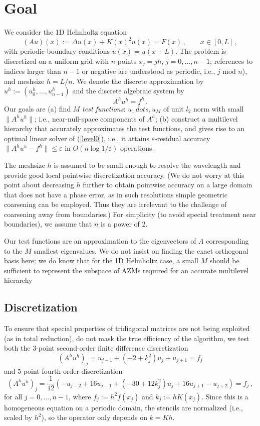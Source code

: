 \documentclass{article}
\begin{document}
\section{Goal}
We consider the 1D Helmholtz equation
\begin{equation}
	\label{helm1d}
	(A u)(x) := \Delta u(x) + K(x)^2 u(x) = F(x)\,,\qquad x \in [0,L]\,,
\end{equation}
with periodic boundary conditions $u(x) = u(x + L)$. The problem is discretized on a uniform grid with $n$ points $x_j = j h$, $j= 0,\dots,n-1$; references to indices larger than $n - 1$ or negative are understood as periodic, i.e., $j \text{ mod } n$), and meshsize $h = L/n$. We denote the discrete approximation by $u^h := (u^h_0,\dots,u^h_{n-1})$ and the discrete algebraic system by
\begin{equation}
	\label{level0}
	A^h u^h = f^h\,.
\end{equation}
Our goals are (a) find $M$ \emph{test functions}: $u_1\,dots,u_M$ of unit $l_2$ norm with small $\|A^h u^h\|$; i.e., near-null-space components of $A^h$; (b) construct a multilevel hierarchy that accurately approximates the test functions, and gives rise to an optimal linear solver of (\ref{level0}), i.e., it attains $\varepsilon$-residual accuracy $\|A^h u^h - f^h \| \leq\varepsilon$ in $O(n \log 1/\varepsilon)$ operations.

The meshsize $h$ is assumed to be small enough to resolve the wavelength and provide good local pointwise discretization accuracy. (We do not worry at this point about decreasing $h$ further to obtain pointwise accuracy on a large domain that does not have a phase error, as in such resolutions simple geometric coarsening can be employed. Thus they are irrelevant to the challenge of coarsening away from boundaries.) For simplicity (to avoid special treatment near boundaries), we assume that $n$ is a power of $2$.

Our test functions are an approximation to the eigenvectors of $A$ corresponding to the $M$ smallest eigenvalues. We do not insist on finding the exact orthogonal basis here; we do know that for the 1D Helmholtz case, a small $M$ should be sufficient to represent the subspace of AZMs required for an accurate multilevel hierarchy

\subsection{Discretization}
To ensure that special properties of tridiagonal matrices are not being exploited (as in total reduction), 
do not mask the true efficiency of the algorithm, we test both the $3$-point second-order finite difference discretization 
$$ (A^h u^h)_j = u_{j-1} + (-2 + k_j^2) u_j + u_{j+1} = f_j$$
and $5$-point  fourth-order discretization
$$ (A^h u^h)_j = \frac{1}{12} \left( -u_{j-2} + 16 u_{j-1} + (-30 + 12 k_j^2) u_j + 16 u_{j+1} - u_{j+2} \right) = f_j\,, $$
for all $j = 0,\dots,n-1$, where $f_j := h^2 f(x_j)$ and $k_j := h K(x_j)$. Since this is a homogeneous equation on a periodic domain, the stencils are normalized (i.e., scaled by $h^2$), so the operator only depends on $k = K h$.
\end{document}
